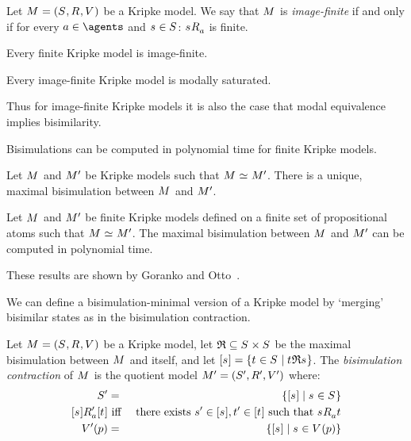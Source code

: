 \begin{definition}
Let $\kModelAndTuple$ be a Kripke model.
We say that $\kModel$ is {\em image-finite} if and only if for every $\agentA \in \agents$ and $\kStateS \in \kStates$: $\kSuccessorsA{\kStateS}$ is finite.
\end{definition}

\begin{proposition}
Every finite Kripke model is image-finite.
\end{proposition}

\begin{proposition}
Every image-finite Kripke model is modally saturated.
\end{proposition}

Thus for image-finite Kripke models it is also the case that modal equivalence implies bisimilarity.

Bisimulations can be computed in polynomial time for finite Kripke models.

\begin{proposition}
Let $\kModel$ and ${M^{\prime}_{}}$ be Kripke models such that $\kModel \bisimilar \kModelP$.
There is a unique, maximal bisimulation between $\kModel$ and ${M^{\prime}_{}}$.
\end{proposition}

\begin{proposition}
Let $\kModel$ and ${M^{\prime}_{}}$ be finite Kripke models defined on a finite set of propositional atoms such that $\kModel \bisimilar \kModelP$.
The maximal bisimulation between $\kModel$ and ${M^{\prime}_{}}$ can be computed in polynomial time.
\end{proposition}

These results are shown by Goranko and Otto~\cite{goranko:2006}.

We can define a bisimulation-minimal version of a Kripke model by `merging' bisimilar states as in the bisimulation contraction.

\begin{definition}
Let $\kModelAndTuple$ be a Kripke model,
let $\bisimulation \subseteq \kStates \times \kStates$ be the maximal bisimulation between $\kModel$ and itself,
and let ${[\kStateS]} = \{\kStateT \in \kStates \mid \kStateT \bisimulation \kStateS\}$.
The {\em bisimulation contraction} of $\kModel$ is the quotient model $\kModelAndTupleP$ where:
\begin{eqnarray*}
    \kStatesP &=& \{{[\kStateS]} \mid \kStateS \in \kStates\}\\
    {[\kStateS]} \kAccessibilityPA {[\kStateT]} &\text{ iff }& \text{there exists } \kStateSP \in {[\kStateS]}, \kStateTP \in {[\kStateT]} \text{ such that } \kStateS \kAccessibilityA \kStateT\\
    \kValuationP(\atomP) &=& \{{[\kStateS]} \mid \kStateS \in \kValuation(\atomP)\}
\end{eqnarray*}
\end{definition}

